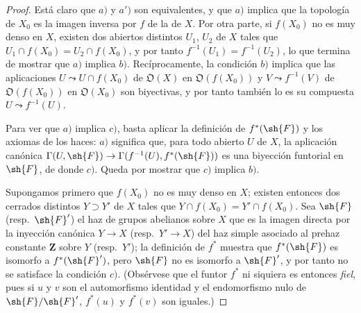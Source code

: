 \begin{proof}
Está claro que $a)$ y $a')$ son equivalentes, y que $a)$ implica que la topología de $X_0$ es la imagen inversa por $f$ de la de $X$.
Por otra parte, si $f(X_0)$ no es muy denso en $X$, existen dos abiertos distintos $U_1$, $U_2$ de $X$ tales que $U_1\cap f(X_0)=U_2\cap f(X_0)$, y por tanto $f^{-1}(U_1)=f^{-1}(U_2)$, lo que termina de mostrar que $a)$ implica $b)$.
Recíprocamente, la condición $b)$ implica que las aplicaciones $U\leadsto U\cap f(X_0)$ de $\mathfrak{O}(X)$ en $\mathfrak{O}(f(X_0))$ y $V\leadsto f^{-1}(V)$ de $\mathfrak{O}(f(X_0))$ en $\mathfrak{O}(X_0)$ son biyectivas, y por tanto también lo es su compuesta $U\leadsto f^{-1}(U)$.

Para ver que $a)$ implica $c)$, basta aplicar la definición de $f^*(\sh{F})$  y los axiomas de los haces: $a)$ significa que, para todo abierto $U$ de $X$, la aplicación canónica $\Gamma(U,\sh{F})\to\Gamma(f^{-1}(U),f^*(\sh{F}))$ es una biyección funtorial en $\sh{F}$, de donde $c)$.
Queda por mostrar que $c)$ implica $b)$.

Supongamos primero que $f(X_0)$ no es muy denso en $X$; existen entonces dos cerrados distintos $Y\supset Y'$ de $X$ tales que $Y\cap f(X_0)=Y'\cap f(X_0)$.
Sea $\sh{F}$ (resp.\ $\sh{F}'$) el haz de grupos abelianos sobre $X$ que es la imagen directa por la inyección canónica $Y\to X$ (resp.\ $Y'\to X$) del haz simple asociado al prehaz constante $\mathbf{Z}$ sobre $Y$ (resp.\ $Y'$); la definición de $f^*$  muestra que $f^*(\sh{F})$ es isomorfo a $f^*(\sh{F}')$, pero $\sh{F}$ no es isomorfo a $\sh{F}'$, y por tanto no se satisface la condición $c)$.
(Obsérvese que el funtor $f^*$ ni siquiera es entonces \emph{fiel}, pues si $u$ y $v$ son el automorfismo identidad y el endomorfismo nulo de $\sh{F}/\sh{F}'$, $f^*(u)$ y $f^*(v)$ son iguales.)


\end{proof}
